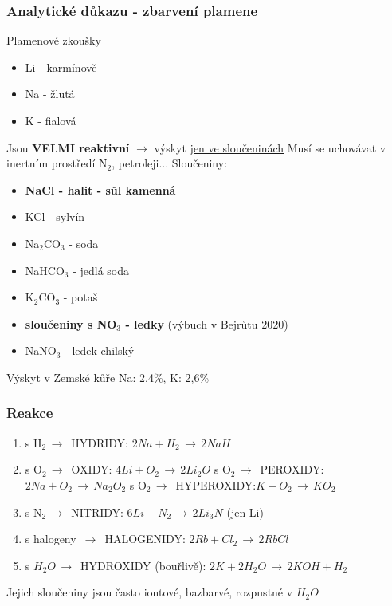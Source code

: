 \documentclass{article}
\def\WATER{H_2O}
\begin{document}
    \subsubsection{Analytické důkazu - zbarvení plamene}
        Plamenové zkoušky
        \begin{itemize}
            \item Li - karmínově
            \item Na - žlutá
            \item K - fialová
        \end{itemize}
    Jsou \textbf{VELMI reaktivní} $\rightarrow$ výskyt \underline{jen ve sloučeninách}
    Musí se uchovávat v inertním prostředí N$_2$, petroleji...
    Sloučeniny:
    \begin{itemize}
        \item \textbf{NaCl - halit - sůl kamenná}
        \item KCl - sylvín
        \item Na$_2$CO$_3$ - soda
        \item NaHCO$_3$ - jedlá soda
        \item K$_2$CO$_3$ - potaš
        \item \textbf{sloučeniny s NO$_3$ - ledky} (výbuch v Bejrůtu 2020)
        \item NaNO$_3$ - ledek chilský
    \end{itemize}
    Výskyt v Zemské kůře Na: 2,4\%, K: 2,6\%
    
    \subsubsection{Reakce}
    \begin{enumerate}
        \item s H$_2\,\to\,$ HYDRIDY: \tab $2Na + H_2\,\to\, 2NaH$
        \item s O$_2\,\to\,$ OXIDY: \tab $4Li + O_2\,\to\, 2Li_2O$
            \newline s O$_2\,\to\,$ PEROXIDY:\tab $2Na + O_2\,\to\, Na_2O_2$
            \newline s O$_2\,\to\,$ HYPEROXIDY:\tab $K + O_2\,\to\, KO_2$
        \item s N$_2\,\to\,$ NITRIDY: \tab $6Li + N_2\,\to\, 2Li_3N$ (jen Li)
        \item s halogeny $\,\to\,$ HALOGENIDY: \tab $2Rb + Cl_2\,\to\, 2RbCl$
        \item s $\WATER \,\to\,$ HYDROXIDY (bouřlivě): \tab $2K + 2\WATER \,\to\, 2KOH + H_2$
    \end{enumerate}
    Jejich sloučeniny jsou často iontové, bazbarvé, rozpustné v $\WATER$
\end{document}
